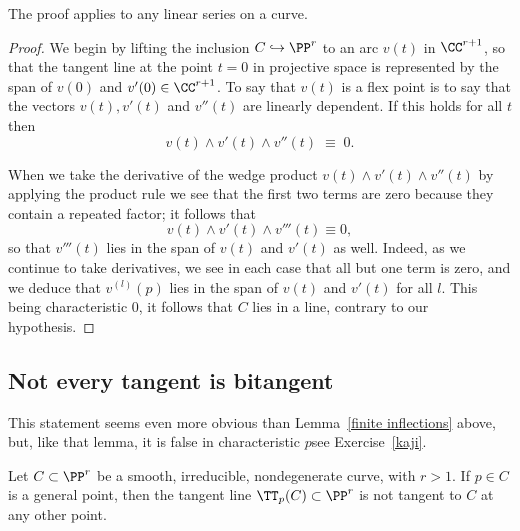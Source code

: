 The proof applies to any linear series on a curve.
\unif

\begin{proof}
We begin by lifting the inclusion $C \hookrightarrow \PP^r$ to an arc
$v (t)$ in $\CC^{r+1}$, so that the tangent line at the point $t=0$
in projective space
is represented by the span of $v(0)$ and $v'(0) \in \CC^{r+1}$. To say
that $v(t)$ is a flex point is to say that the  vectors $v(t), v'(t)$
and $v''(t)$ are linearly dependent. If this holds for all $t$ then
$$
v(t) \wedge  v'(t) \wedge v''(t) \; \equiv \; 0.
$$

When we take the derivative of the wedge product $v(t) \wedge v'(t)
\wedge v''(t)$ by applying the product rule we see that the first two
terms are zero because they contain a repeated factor; it follows that
$$
v(t) \wedge  v'(t) \wedge v'''(t) \equiv 0,
$$
so that $v'''(t)$ lies in the span of $v(t)$ and $v'(t)$ as well. Indeed,
as we continue to take derivatives, we see in each case that all but one
term is zero, and we deduce that $v^{(l)}(p)$ lies in the span of $v(t)$
and $v'(t)$ for all $l$. This being characteristic 0, it follows that $C$
lies in a line, contrary to our hypothesis.
\end{proof}


\subsection*{Not every tangent is bitangent}

 This statement seems even more obvious than Lemma~\ref{finite
 inflections} above, but, like that lemma, it is false in
 characteristic $p$\emdash see Exercise~\ref{kaji}.


 \begin{lemma}\label{tangent not bitangent}
 Let $C \subset \PP^r$ be a smooth, irreducible, nondegenerate curve,
 with $r > 1$. If $p \in C$ is a general point, then the tangent line
 $\TT_p(C) \subset \PP^r$ is not tangent to $C$ at any other point.
\unif
 \end{lemma}

